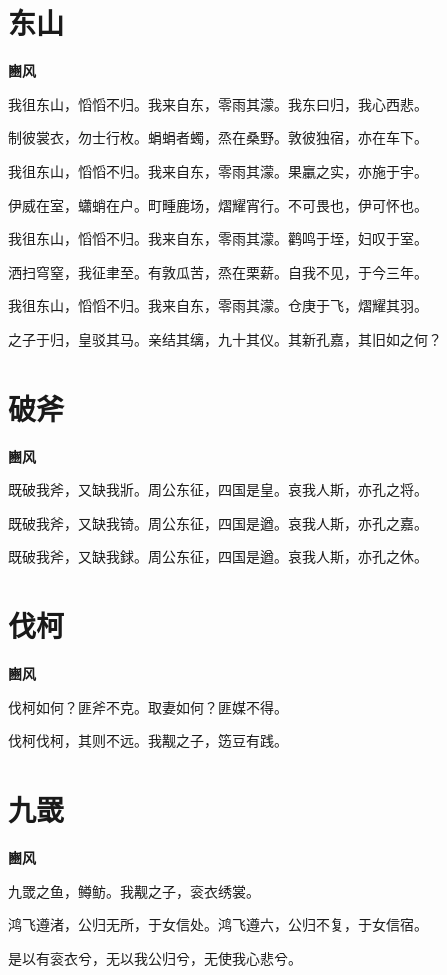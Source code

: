 \documentclass[12pt,a4paper]{ctexbook}
\begin{document}
\section{东山}
\textbf{豳风}\par\vspace{0.5em}
我徂东山，慆慆不归。我来自东，零雨其濛。我东曰归，我心西悲。\par
制彼裳衣，勿士行枚。蜎蜎者蠋，烝在桑野。敦彼独宿，亦在车下。\par
我徂东山，慆慆不归。我来自东，零雨其濛。果臝之实，亦施于宇。\par
伊威在室，蠨蛸在户。町畽鹿场，熠耀宵行。不可畏也，伊可怀也。\par
我徂东山，慆慆不归。我来自东，零雨其濛。鹳鸣于垤，妇叹于室。\par
洒扫穹窒，我征聿至。有敦瓜苦，烝在栗薪。自我不见，于今三年。\par
我徂东山，慆慆不归。我来自东，零雨其濛。仓庚于飞，熠耀其羽。\par
之子于归，皇驳其马。亲结其缡，九十其仪。其新孔嘉，其旧如之何？\par

\section{破斧}
\textbf{豳风}\par\vspace{0.5em}
既破我斧，又缺我斨。周公东征，四国是皇。哀我人斯，亦孔之将。\par
既破我斧，又缺我锜。周公东征，四国是遒。哀我人斯，亦孔之嘉。\par
既破我斧，又缺我銶。周公东征，四国是遒。哀我人斯，亦孔之休。\par

\section{伐柯}
\textbf{豳风}\par\vspace{0.5em}
伐柯如何？匪斧不克。取妻如何？匪媒不得。\par
伐柯伐柯，其则不远。我觏之子，笾豆有践。\par

\section{九罭}
\textbf{豳风}\par\vspace{0.5em}
九罭之鱼，鳟鲂。我觏之子，衮衣绣裳。\par
鸿飞遵渚，公归无所，于女信处。鸿飞遵六，公归不复，于女信宿。\par
是以有衮衣兮，无以我公归兮，无使我心悲兮。\par
\end{document}
